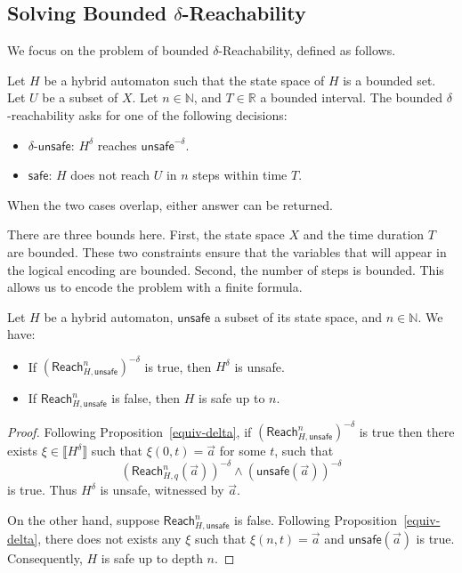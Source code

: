 \documentclass[envcountsect]{llncs}
\newcommand{\reach}{\mathsf{Reach}}
\newcommand{\unsafe}{\mathsf{unsafe}}
\newcommand{\safe}{\mathsf{safe}}
\begin{document}
\subsection{Solving Bounded $\delta$-Reachability}


We focus on the problem of bounded $\delta$-Reachability, defined as follows. 

\begin{definition}
Let $H$ be a hybrid automaton such that the state space of $H$ is a bounded set. Let $U$ be a subset of $X$. Let $n\in \mathbb{N}$, and $T\in \mathbb{R}$ a bounded interval. The bounded $\delta$-reachability asks for one of the following decisions:
\begin{itemize}
\item $\delta$-$\unsafe$: $H^{\delta}$ reaches $\unsafe^{-\delta}$.  
\item $\safe$: $H$ does not reach $U$ in $n$ steps within time $T$. 
\end{itemize} 
When the two cases overlap, either answer can be returned. 
\end{definition}

\begin{remark}
There are three bounds here. First, the state space $X$ and the time duration $T$ are bounded. These two constraints ensure that the variables that will appear in the logical encoding are bounded. Second, the number of steps is bounded. This allows us to encode the problem with a finite formula. 
\end{remark}


\begin{lemma}\label{bmclemma}
Let $H$ be a hybrid automaton, $\unsafe$ a subset of its state space, and $n\in\mathbb{N}$. We have:
\begin{itemize}
\item If $(\reach^n_{H,\unsafe})^{-\delta}$ is true, then $H^{\delta}$ is unsafe. 
\item If $\reach^n_{H,\unsafe}$ is false, then $H$ is safe up to $n$. 
\end{itemize}
\end{lemma}

\begin{proof}
Following Proposition~\ref{equiv-delta}, if $(\reach^n_{H,\unsafe})^{-\delta}$ is true then there exists $\xi\in \llbracket H^{\delta}\rrbracket$ such that $\xi(0,t)=\vec a$ for some $t$, such that 
$$(\reach^n_{H,q}(\vec a))^{-\delta} \wedge (\unsafe(\vec a))^{-\delta}$$
is true. Thus $H^{\delta}$ is unsafe, witnessed by $\vec a$. 

On the other hand, suppose $\reach^n_{H,\unsafe}$ is false. Following Proposition~\ref{equiv-delta}, there does not exists any $\xi$ such that $\xi(n,t) = \vec a$ and $\unsafe(\vec a)$ is true. Consequently, $H$ is safe up to depth $n$. 
\end{proof}
\end{document}
